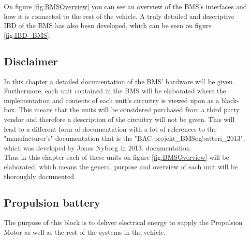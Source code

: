 On figure \ref{fig:BMSOverview} you can see an overview of the BMS's interfaces and how it is connected to the rest of the vehicle. A truly detailed and descriptive IBD of the BMS has also been developed, which can be seen on figure \ref{fig:IBD_BMS}.

\subsection{Disclaimer}
In this chapter a detailed documentation of the BMS' hardware will be given. Furthermore, each unit contained in the BMS will be elaborated where the implementation and contents of each unit's circuitry is viewed upon as a black-box. This means that the units will be considered purchased from a third party vendor and therefore a  description of the circuitry will not be given. This will lead to a different form of documentation with a lot of references to the "manufacturer's" documentation that is the "BAC-projekt\_BMSogbatteri\_2013", which was developed by Jonas Nyborg in 2013.  documentation.\\
Thus in this chapter each of these units on figure \ref{fig:BMSOverview} will be elaborated, which means the general purpose and overview of each unit will be thoroughly documented. 

\subsection{Propulsion battery}
\label{sec:BMSBattery}
The purpose of this block is to deliver electrical energy to supply the Propulsion Motor as well as the rest of the systems in the vehicle.

